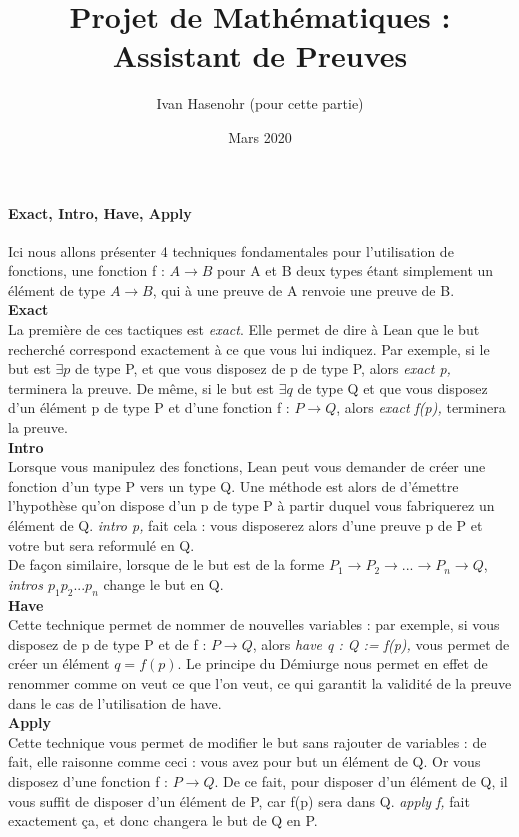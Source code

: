 \documentclass[french,frenchkw]{article}
\title{Projet de Mathématiques : Assistant de Preuves}
\author{Ivan Hasenohr (pour cette partie)}
\date{Mars 2020}
\begin{document}
\maketitle
\paragraph{Exact, Intro, Have, Apply}
Ici nous allons présenter 4 techniques fondamentales pour l'utilisation de fonctions, une fonction f : $A\to B$ pour A et B deux types étant simplement un élément de type $A\to B$, qui à une preuve de A renvoie une preuve de B.\\
\textbf{Exact}\\
La première de ces tactiques est \textit{exact}. Elle permet de dire à Lean que le but recherché correspond exactement à ce que vous lui indiquez. Par exemple, si le but est  $\exists  p$ de type P, et que vous disposez de p de type P, alors \textit{exact p,} terminera la preuve. De même, si le but est  $\exists  q$ de type Q et que vous disposez d'un élément p de type P et d'une fonction f : $P \to Q$, alors \textit{exact f(p),} terminera la preuve.\\
\textbf{Intro} \\
Lorsque vous manipulez des fonctions, Lean peut vous demander de créer une fonction d'un type P vers un type Q. Une méthode est alors de d'émettre l'hypothèse qu'on dispose d'un p de type P à partir duquel vous fabriquerez un élément de Q. \textit{intro p,} fait cela : vous disposerez alors d'une preuve p de P et votre but sera reformulé en Q. \\
De façon similaire, lorsque de le but est de la forme $P_1 \to P_2 \to ... \to P_n \to Q$, \textit{intros $p_1 p_2 ... p_n$} change le but en Q.\\
\textbf{Have} \\
Cette technique permet de nommer de nouvelles variables : par exemple, si vous disposez de p de type P et de f : $P \to Q$, alors \textit{have q : Q := f(p),} vous permet de créer un élément $q = f(p)$. Le principe du Démiurge nous permet en effet de renommer comme on veut ce que l'on veut, ce qui garantit la validité de la preuve dans le cas de l'utilisation de have. \\
\textbf{Apply}\\
Cette technique vous permet de modifier le but sans rajouter de variables : de fait, elle raisonne comme ceci : vous avez pour but un élément de Q. Or vous disposez d'une fonction f : $P \to Q$. De ce fait, pour disposer d'un élément de Q, il vous suffit de disposer d'un élément de P, car f(p) sera dans Q. \textit{apply f,} fait exactement ça, et donc changera le but de Q en P.\\
\end{document}

